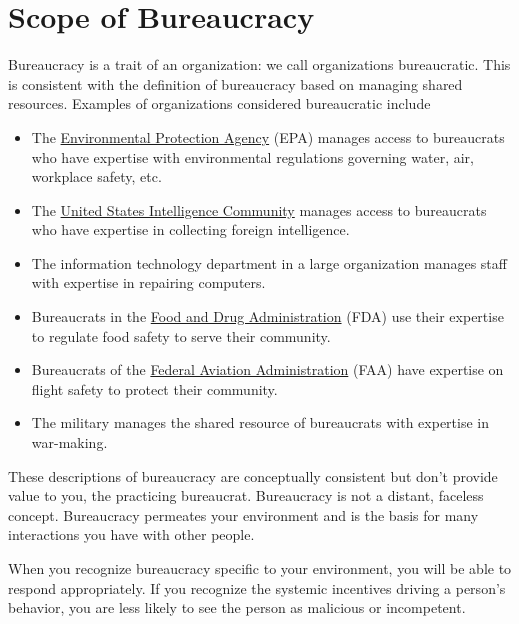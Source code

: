 \section{Scope of Bureaucracy}
Bureaucracy is a trait of an organization: we call organizations bureaucratic. This is consistent with the definition of bureaucracy based on managing \glspl{shared resource}. Examples of organizations considered bureaucratic include
  \begin{itemize}
      \item The \href{https://www.epa.gov/}{Environmental Protection Agency} (EPA) manages access to bureaucrats who have expertise with environmental regulations governing water, air, workplace safety, etc.
      \item The \href{https://www.intelligence.gov/}{United States Intelligence Community} manages access to bureaucrats who have expertise in collecting foreign intelligence.
      \item The information technology department in a large organization manages staff with expertise in repairing computers.
      \item Bureaucrats in the \href{https://www.fda.gov/}{Food and Drug Administration} (FDA) use their expertise to regulate food safety to serve their community.
      \item Bureaucrats of the \href{https://www.faa.gov/}{Federal Aviation Administration} (FAA) have expertise on flight safety to protect their community.
      \item The military manages the shared resource of bureaucrats with expertise in war-making.
  \end{itemize}

These descriptions of bureaucracy are conceptually consistent but don't provide value to you, the practicing bureaucrat. Bureaucracy is not a distant, faceless concept. Bureaucracy permeates your environment and is the basis for many interactions you have with other people. 

When you recognize bureaucracy specific to your environment, you will be able to respond appropriately. If you recognize the systemic incentives driving a person's behavior, you are less likely to see the person as malicious or incompetent. 